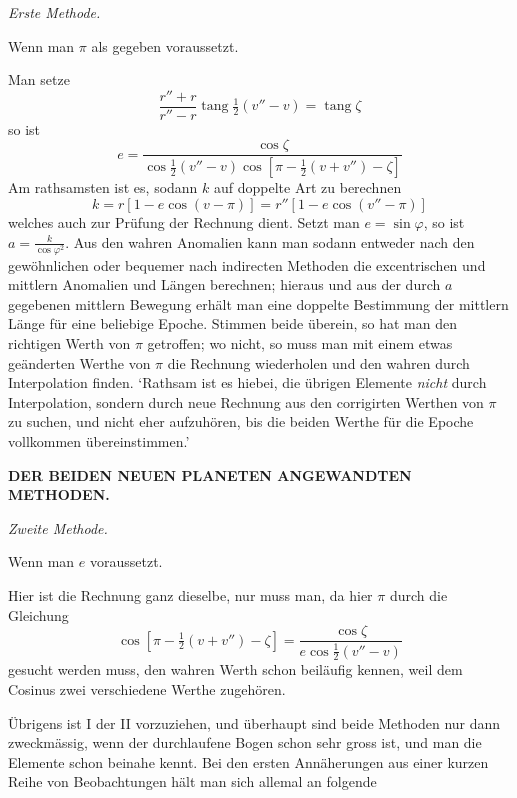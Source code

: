\par\medskip\noindent\hspace*{1.5em}\emph{Erste Methode.}\par\nobreak
\indent Wenn man $\pi$ als gegeben voraussetzt.\par
\indent Man setze
\[
\frac{r''+r}{r''-r}\operatorname{tang}\tfrac12(v''-v)=\operatorname{tang}\zeta
\]
so ist
\[
e=\frac{\cos\zeta}{\cos\tfrac12(v''-v)\cos[\pi-\tfrac12(v+v'')-\zeta]}
\]
Am rathsamsten ist es, sodann $k$ auf doppelte Art zu berechnen
\[
k=r[1-e\cos(v-\pi)]=r''[1-e\cos(v''-\pi)]
\]
welches auch zur Prüfung der Rechnung dient. Setzt man $e=\sin\varphi$, so ist $a=\frac{k}{\cos\varphi^2}$. Aus den wahren Anomalien kann man sodann entweder nach den gewöhnlichen oder bequemer nach indirecten Methoden die excentrischen und mittlern Anomalien und Längen berechnen; hieraus und aus der durch $a$ gegebenen mittlern Bewegung erhält man eine doppelte Bestimmung der mittlern Länge für eine beliebige Epoche. Stimmen beide überein, so hat man den richtigen Werth von $\pi$ getroffen; wo nicht, so muss man mit einem etwas geänderten Werthe von $\pi$ die Rechnung wiederholen und den wahren durch Interpolation finden. ‘Rathsam ist es hiebei, die übrigen Elemente \emph{nicht} durch Interpolation, sondern durch neue Rechnung aus den corrigirten Werthen von $\pi$ zu suchen, und nicht eher aufzuhören, bis die beiden Werthe für die Epoche vollkommen übereinstimmen.’
\par\clearpage
\thispagestyle{empty}
\noindent{}%
\makebox[12mm][l]{}%
\parbox[t]{\dimexpr\linewidth-24mm\relax}{\centering\fontsize{7.4}{9.2}\selectfont\bfseries DER BEIDEN NEUEN PLANETEN ANGEWANDTEN METHODEN.\par}%
\par\nobreak\smallskip
\noindent\hspace*{1.5em}\emph{Zweite Methode.}\par\nobreak
\indent Wenn man $e$ voraussetzt.\par
\indent Hier ist die Rechnung ganz dieselbe, nur muss man, da hier $\pi$ durch die Gleichung
\[
\cos[\pi-\tfrac12(v+v'')-\zeta]=\frac{\cos\zeta}{e\cos\tfrac12(v''-v)}
\]
gesucht werden muss, den wahren Werth schon beiläufig kennen, weil dem Cosinus zwei verschiedene Werthe zugehören.

Übrigens ist I der II vorzuziehen, und überhaupt sind beide Methoden nur dann zweckmässig, wenn der durchlaufene Bogen schon sehr gross ist, und man die Elemente schon beinahe kennt. Bei den ersten Annäherungen aus einer kurzen Reihe von Beobachtungen hält man sich allemal an folgende

